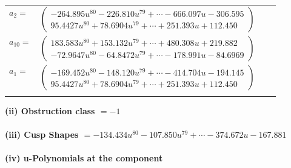 \documentclass[1p]{elsarticle_modified}
\theoremstyle{definition}
\begin{document}
\begin{tabular}{m{7pt} m{180pt} m{7pt} m{180pt} }
\flushright $a_{2}=$&$\begin{pmatrix}-264.895 u^{80}-226.810 u^{79}+\cdots-666.097 u-306.595\\95.4427 u^{80}+78.6904 u^{79}+\cdots+251.393 u+112.450\end{pmatrix}$ \\
\flushright $a_{10}=$&$\begin{pmatrix}183.583 u^{80}+153.132 u^{79}+\cdots+480.308 u+219.882\\-72.9647 u^{80}-64.8472 u^{79}+\cdots-178.991 u-84.6969\end{pmatrix}$ \\
\flushright $a_{1}=$&$\begin{pmatrix}-169.452 u^{80}-148.120 u^{79}+\cdots-414.704 u-194.145\\95.4427 u^{80}+78.6904 u^{79}+\cdots+251.393 u+112.450\end{pmatrix}$\\&\end{tabular}
\flushleft \textbf{(ii) Obstruction class $= -1$}\\~\\
\flushleft \textbf{(iii) Cusp Shapes $= -134.434 u^{80}-107.850 u^{79}+\cdots-374.672 u-167.881$}\\~\\
\newpage\renewcommand{\arraystretch}{1}
\flushleft \textbf{(iv) u-Polynomials at the component}\newline \\
\end{document}
